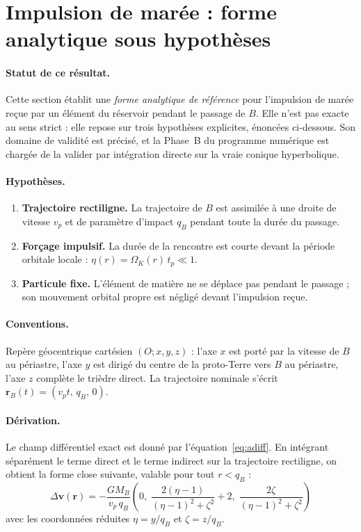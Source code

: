 \documentclass[11pt,a4paper,openany]{report}
\begin{document}
\section{Impulsion de marée : forme analytique sous hypothèses}
\label{app:impulsion}

\paragraph{Statut de ce résultat.}
Cette section établit une \emph{forme analytique de référence} pour l'impulsion de marée reçue par
un élément du réservoir pendant le passage de $B$. Elle n'est pas exacte au sens strict : elle
repose sur trois hypothèses explicites, énoncées ci-dessous. Son domaine de validité est précisé,
et la Phase~B du programme numérique est chargée de la valider par intégration directe sur la vraie
conique hyperbolique.

\paragraph{Hypothèses.}
\begin{enumerate}
\item \textbf{Trajectoire rectiligne.} La trajectoire de $B$ est assimilée à une droite de vitesse
$v_p$ et de paramètre d'impact $q_B$ pendant toute la durée du passage.
\item \textbf{Forçage impulsif.} La durée de la rencontre est courte devant la période orbitale
locale : $\eta(r)=\Omega_K(r)\,t_{p}\ll1$.
\item \textbf{Particule fixe.} L'élément de matière ne se déplace pas pendant le passage ; son
mouvement orbital propre est négligé devant l'impulsion reçue.
\end{enumerate}

\paragraph{Conventions.}
Repère géocentrique cartésien $(O;x,y,z)$ : l'axe $x$ est porté par la vitesse de $B$ au périastre,
l'axe $y$ est dirigé du centre de la proto-Terre vers $B$ au périastre, l'axe $z$ complète le trièdre
direct. La trajectoire nominale s'écrit $\mathbf{r}_B(t)=(v_p t,\,q_B,\,0)$.

\paragraph{Dérivation.}
Le champ différentiel exact est donné par l'équation~\eqref{eq:adiff}. En intégrant séparément le
terme direct et le terme indirect sur la trajectoire rectiligne, on obtient la forme close
suivante, valable pour tout $r<q_B$ :
\begin{equation}
\boxed{\;
\Delta\mathbf{v}(\mathbf{r})
=
-\frac{GM_B}{v_p\,q_B}
\left(
0,\;
\frac{2(\eta-1)}{(\eta-1)^2+\zeta^2}+2,\;
\frac{2\zeta}{(\eta-1)^2+\zeta^2}
\right)
\;}
\label{eq:impulsion-close}
\end{equation}
avec les coordonnées réduites $\eta=y/q_B$ et $\zeta=z/q_B$.
\end{document}
